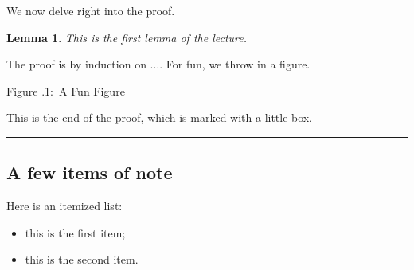 \documentclass[twoside]{article}
\newcounter{lecnum}
\newcommand{\fig}[3]{
			\vspace{#2}
			\begin{center}
			Figure \thelecnum.#1:~#3
			\end{center}
	}
\newtheorem{lemma}[theorem]{Lemma}
\newenvironment{proof}{{\bf Proof:}}{\hfill\rule{2mm}{2mm}}
\begin{document}

























We now delve right into the proof.

\begin{lemma}
This is the first lemma of the lecture.
\end{lemma}

\begin{proof}
The proof is by induction on $\ldots$.
For fun, we throw in a figure.
\fig{1}{1in}{A Fun Figure}

This is the end of the proof, which is marked with a little box.
\end{proof}

\subsection{A few items of note}

Here is an itemized list:
\begin{itemize}
\item this is the first item;
\item this is the second item.
\end{itemize}
\end{document}
